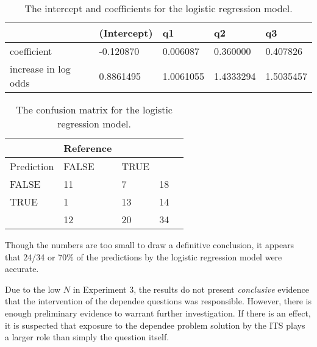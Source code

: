 \begin{table}[p!]
\label{tab:coeffs}
\caption{The intercept and coefficients for the logistic regression model.}
\vspace{12pt}
\begin{tabularx}{\textwidth}{|X|X|X|X|X|}
\hline \hline
                     & (Intercept)  & q1         & q2          & q3         \\ \hline
 coefficient         & -0.120870    & 0.006087   & 0.360000    & 0.407826   \\ \hline
increase in log odds & 0.8861495    & 1.0061055  & 1.4333294   & 1.5035457  \\ \hline
\hline \hline
\end{tabularx}
\vspace{24pt}
\end{table}


\begin{table}[p!]
\label{tab:confu}
\caption{The confusion matrix for the logistic regression model.}
\vspace{12pt}
\begin{tabularx}{\textwidth}{|X|X|X|X|X|}
\hline \hline
                     & Reference &       &     \\ \hline \hline
          Prediction & FALSE     & TRUE  &     \\ \hline
          FALSE      & 11        & 7     & 18  \\ \hline
          TRUE       & 1         & 13    & 14  \\ \hline
                     & 12        & 20    & 34  \\ \hline \hline
\end{tabularx}
\vspace{24pt}
\end{table}


Though the numbers are too small to draw a definitive conclusion, it appears
that 24/34 or 70\% of the predictions by the logistic regression model were
accurate. 

Due to the low $N$ in Experiment 3, the results do not present
\emph{conclusive} evidence that the intervention of the dependee questions was
responsible.  However, there is enough preliminary evidence to warrant further
investigation.  If there is an effect, it is suspected that exposure to the
dependee problem solution by the ITS plays a larger role than simply the
question itself.

